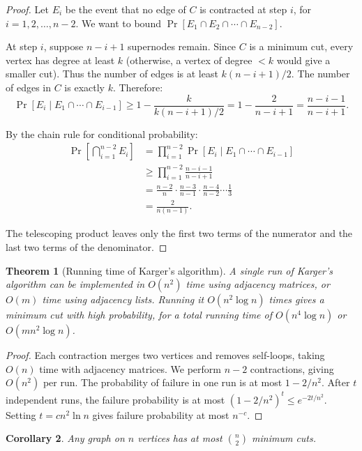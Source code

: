 \documentclass[twoside,12pt]{book}
\theoremstyle{plain}
\newtheorem{theorem}{Theorem}[chapter]
\newtheorem{corollary}[theorem]{Corollary}
\theoremstyle{definition}
\theoremstyle{remark}
\begin{document}
\begin{proof}
Let $E_i$ be the event that no edge of $C$ is contracted at step $i$, for $i = 1, 2, \ldots, n-2$. We want to bound $\Pr[E_1 \cap E_2 \cap \cdots \cap E_{n-2}]$.

At step $i$, suppose $n - i + 1$ supernodes remain. Since $C$ is a minimum cut, every vertex has degree at least $k$ (otherwise, a vertex of degree $< k$ would give a smaller cut). Thus the number of edges is at least $k(n - i + 1) / 2$. The number of edges in $C$ is exactly $k$. Therefore:
\[
\Pr[E_i \mid E_1 \cap \cdots \cap E_{i-1}] \geq 1 - \frac{k}{k(n - i + 1)/2} = 1 - \frac{2}{n - i + 1} = \frac{n - i - 1}{n - i + 1}.
\]

By the chain rule for conditional probability:
\begin{align*}
\Pr\left[\bigcap_{i=1}^{n-2} E_i\right]
&= \prod_{i=1}^{n-2} \Pr[E_i \mid E_1 \cap \cdots \cap E_{i-1}] \\
&\geq \prod_{i=1}^{n-2} \frac{n - i - 1}{n - i + 1} \\
&= \frac{n-2}{n} \cdot \frac{n-3}{n-1} \cdot \frac{n-4}{n-2} \cdots \frac{1}{3} \\
&= \frac{2}{n(n-1)}.
\end{align*}

The telescoping product leaves only the first two terms of the numerator and the last two terms of the denominator.
\end{proof}

\begin{theorem}[Running time of Karger's algorithm]
A single run of Karger's algorithm can be implemented in $O(n^2)$ time using adjacency matrices, or $O(m)$ time using adjacency lists. Running it $O(n^2 \log n)$ times gives a minimum cut with high probability, for a total running time of $O(n^4 \log n)$ or $O(mn^2 \log n)$.
\end{theorem}

\begin{proof}
Each contraction merges two vertices and removes self-loops, taking $O(n)$ time with adjacency matrices. We perform $n - 2$ contractions, giving $O(n^2)$ per run. The probability of failure in one run is at most $1 - 2/n^2$. After $t$ independent runs, the failure probability is at most $(1 - 2/n^2)^t \leq e^{-2t/n^2}$. Setting $t = cn^2 \ln n$ gives failure probability at most $n^{-c}$.
\end{proof}

\begin{corollary}
Any graph on $n$ vertices has at most $\binom{n}{2}$ minimum cuts.
\end{corollary}
\end{document}
